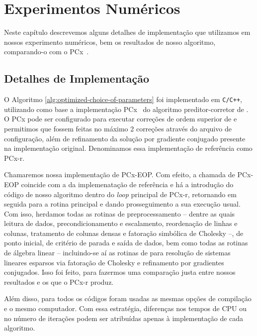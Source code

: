 \chapter{Experimentos Numéricos}
\label{chap:numerical}

Neste capítulo descrevemos alguns detalhes de implementação que utilizamos em nossos experimento numéricos, bem os resultados de nosso algoritmo, comparando-o com o  PCx~\cite{Czyzyk:1999hk}.



\section{Detalhes de Implementação}

O Algoritmo \ref{alg:optimized-choice-of-parameters} foi implementado em  \texttt{C/C++}, utilizando como base a implementação PCx~\cite{Czyzyk:1999hk} do algoritmo preditor-corretor de \textcite{Mehrotra:1992wr}. O PCx pode ser configurado para executar correções de ordem superior de \textcite{Gondzio:1996uw} e permitimos que fossem feitas no máximo 2 correções através do arquivo de configuração, além de  refinamento da solução por gradiente conjugado presente na implementação original. Denominamos essa implementação de referência como PCx-r.

  Chamaremos nossa implementação de PCx-EOP. Com efeito, a chamada de PCx-EOP coincide com a da implemenatação de referência e há a introdução do código de nosso algoritmo dentro do \emph{loop} principal de PCx-r,  retornando em seguida para a rotina principal e dando prosseguimento a sua execução usual. Com isso, herdamos todas as rotinas de preprocessamento -- dentre as quais leitura de dados, precondicionamento e escalamento, reordenação de linhas e colunas, tratamento de colunas densas e fatoração simbólica de Cholesky --, de ponto inicial, de critério de parada e saída de dados,   bem como todas as rotinas de álgebra linear -- incluindo-se aí as rotinas de \textcite{Ng:1993uz} para resolução de sistemas lineares esparsos via fatoração de Cholesky  e refinamento por gradientes conjugados. Isso foi feito, para fazermos uma comparação justa entre nossos resultados e os que o PCx-r produz. 



Além disso, para todos os códigos foram usadas as mesmas opções de compilação e o mesmo computador. Com essa estratégia, diferenças nos tempos de CPU ou no número de iterações podem ser atribuídas apenas à implementação de cada algoritmo.
